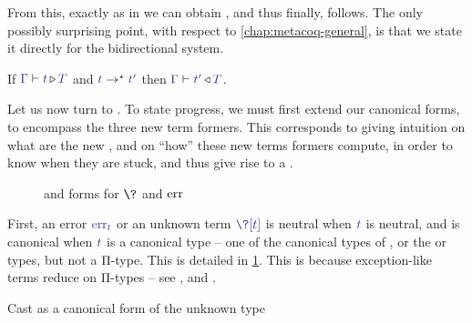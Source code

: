 From this, exactly as in  we can obtain ,
and thus finally,  follows. The only possibly surprising point,
with respect to \cref{chap:metacoq-general}, is that we state it directly for the bidirectional
system.

\begin{theorem}
  If $\cinferty{\Gamma}{t}{T}$ and $\tcol{t} \red \tcol{t'}$ then $\ccheckty{\Gamma}{t'}{T}$.
\end{theorem}

Let us now turn to .
To state progress, we must first extend our canonical forms, to encompass the three new
term formers. This corresponds to giving intuition on what are the new ,
and on “how” these new terms formers compute, in order to know when they are stuck, and thus
give rise to a .

\begin{figure}[h]
  \ContinuedFloat*
  \caption{ and  forms for $\?$ and $\err$}
  \label{fig:ccic-nor-exc}
\end{figure}

First, an error $\tcol{\err[t]}$ or an unknown term $\tcol{\?[t]}$ is neutral when
$\tcol{t}$ is neutral,
and is canonical when $\tcol{t}$ is a canonical type – one of the canonical types of ,
or the  or  types, but not a Π-type.
This is detailed in \cref{fig:ccic-nor-exc}.
This is because exception-like terms reduce on Π-types – see ,
and .

\begin{marginfigure}
  \ContinuedFloat
  \begin{mathpar}
  \end{mathpar}
  \caption{Cast as a canonical form of the unknown type}
  \label{fig:ccic-cast-nor}
\end{marginfigure}

